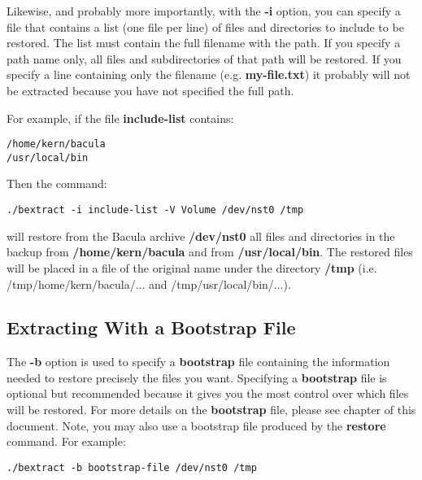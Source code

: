 Likewise, and probably more importantly, with the {\bf -i} option, you can
specify a file that contains a list (one file per line) of files and
directories to include to be restored. The list must contain the full filename
with the path. If you specify a path name only, all files and subdirectories
of that path will be restored. If you specify a line containing only the
filename (e.g. {\bf my-file.txt}) it probably will not be extracted because
you have not specified the full path. 

For example, if the file {\bf include-list} contains: 

\footnotesize
\begin{verbatim}
/home/kern/bacula
/usr/local/bin
\end{verbatim}
\normalsize

Then the command: 

\footnotesize
\begin{verbatim}
./bextract -i include-list -V Volume /dev/nst0 /tmp
\end{verbatim}
\normalsize

will restore from the Bacula archive {\bf /dev/nst0} all files and directories
in the backup from {\bf /home/kern/bacula} and from {\bf /usr/local/bin}. The
restored files will be placed in a file of the original name under the
directory {\bf /tmp} (i.e. /tmp/home/kern/bacula/... and
/tmp/usr/local/bin/...). 

\subsection{Extracting With a Bootstrap File}

The {\bf -b} option is used to specify a {\bf bootstrap} file containing the
information needed to restore precisely the files you want. Specifying a {\bf
bootstrap} file is optional but recommended because it gives you the most
control over which files will be restored. For more details on the {\bf
bootstrap} file, please see 
chapter of this document. Note, you may also use a bootstrap file produced by
the {\bf restore} command. For example: 

\footnotesize
\begin{verbatim}
./bextract -b bootstrap-file /dev/nst0 /tmp
\end{verbatim}
\normalsize

